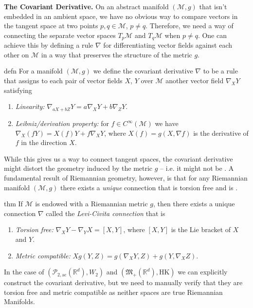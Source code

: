 \documentclass[11pt]{article}
\newcommand{\man}{\mathcal{M}}
\newcommand{\pac}{\mathcal{P}_{2, \text{ac}}(\mathbb{R}^d)}
\newcommand{\posm}{\mathfrak{M}_+(\mathbb{R}^d)}
\begin{document}
\noindent \textbf{The Covariant Derivative.} 
On an abstract manifold $(\man, g)$ that isn't embedded in an ambient space, we have no obvious way to compare vectors in the tangent space at two points $p, q \in \man$, $p \neq q$. Therefore, we need a way of connecting the separate vector spaces $T_p\man$ and $T_q\man$ when $p \neq q$. One can achieve this by defining a rule $\nabla$ for differentiating vector fields against each other on $\man$ in a way that preserves the structure of the metric $g$.

\begin{restatable}{defn}{}
    For a manifold $(\man, g)$ we define the covariant derivative $\nabla$ to be a rule that assigns to each pair of vector fields $X$, $Y$ over $\man$ another vector field $\nabla_XY$ satisfying 
    \begin{enumerate}
        \item \textit{Linearity:} $\nabla_{aX+bZ}Y = a\nabla_XY + b\nabla_ZY.$
        \item \textit{Leibniz/derivation property:} for $f \in C^{\infty}(\man)$ we have $\nabla_X(fY) = X(f)Y + f\nabla_XY$, where $X(f) = g(X, \nabla f)$ is the derivative of $f$ in the direction $X$.
    \end{enumerate}
\end{restatable}

While this gives us a way to connect tangent spaces, the covariant derivative might distort the geometry induced by the metric $g$ -- i.e. it might not be . A fundamental result of Riemannian geometry, however, is that for any Riemannian manifold $(\man, g)$ there exists a \textit{unique} connection that is torsion free and is . 

\begin{restatable}{thm}{}
    If $\man$ is endowed with a Riemannian metric $g$, then there exists a unique connection $\nabla$ called the \textit{Levi-Civita connection} that is
    \begin{enumerate}
        \item \textit{Torsion free:} $\nabla_XY - \nabla_YX = [X,Y]$, where $[X,Y]$ is the Lie bracket of $X$ and $Y$. 
        \item \textit{Metric compatible:} $Xg(Y, Z) = g(\nabla_XY, Z) + g(Y, \nabla_XZ).$ 
    \end{enumerate}
\end{restatable}
In the case of $(\pac, W_2)$ and $(\posm, \text{HK})$ we can explicitly construct the covariant derivative, but we need to manually verify that they are torsion free and metric compatible as neither spaces are true Riemannian Manifolds.
\end{document}
